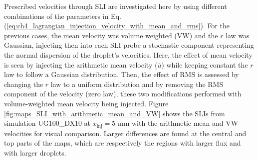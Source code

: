 Prescribed velocities through SLI are investigated here by using different combinations of the parameters in Eq. (\ref{eq:ch4_lagrangian_injection_velocity_with_mean_and_rms}). For the previous cases, the mean velocity was volume weighted (VW) and the $r$ law was Gaussian, injecting then into each SLI probe a stochastic component representing the normal dispersion of the droplet's velocities. Here, the effect of mean velocity is seen by injecting the arithmetic mean velocity ($\overline{u}$) while keeping constant the $r$ law to follow a Gaussian distribution. Then, the effect of RMS is assessed by changing the $r$ law to a uniform distribution and by removing the RMS component of the velocity (zero law), these two modifications performed with volume-weighted mean velocity being injected. Figure \ref{fig:maps_SLI_with_arithmetic_mean_and_VW} shows the SLIs from simulation UG100\_DX10 at $x_\mathrm{inj} = 5$ mm with the arithmetic mean and VW velocities for visual comparison. Larger differences are found at the central and top parts of the maps, which are respectively the regions with larger flux and with larger droplets.%


